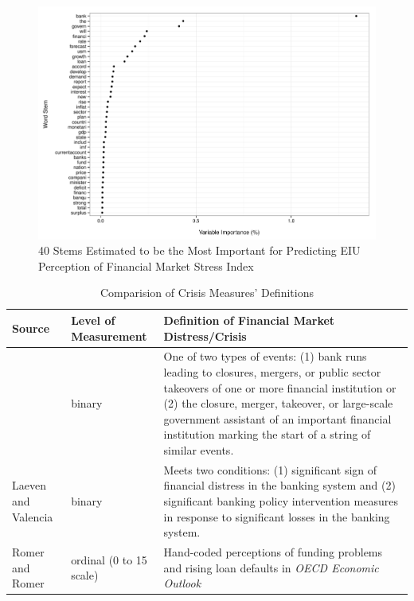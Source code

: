 \documentclass[]{article}
\begin{document}
\begin{figure}
    \caption{40 Stems Estimated to be the Most Important for Predicting EIU Perception of Financial Market Stress Index}
    \label{rf_importance}

    \begin{center}
        \includegraphics[scale=0.5]{analysis/figures/rf_stem_importance.pdf}
    \end{center}

\end{figure}

\begin{table}
    \caption{Comparision of Crisis Measures' Definitions}
    \label{comp_table}
    \begin{center}
        \begin{tabular}{m{3cm} | m{2.25cm} m{7cm}}
            Source & Level of Measurement &  Definition of Financial Market Distress/Crisis \\
            \hline
                \cite{Reinhart2009} & binary & One of two types of events: (1) bank runs leading to closures, mergers, or public sector takeovers of one or more financial institution or (2) the closure, merger, takeover, or large-scale government assistant of an important financial institution marking the start of a string of similar events.  \\
                Laeven and Valencia \citeyearpar[228]{laeven2013} & binary & Meets two conditions: (1) significant sign of financial distress in the banking system and (2) significant banking policy intervention measures in response to significant losses in the banking system.  \\
                Romer and Romer \citeyearpar[3]{Romer2015} & ordinal (0 to 15 scale) & Hand-coded perceptions of funding problems and rising loan defaults in \emph{OECD Economic Outlook}  \\
            \hline
        \end{tabular}
    \end{center}
\end{table}
\end{document}
